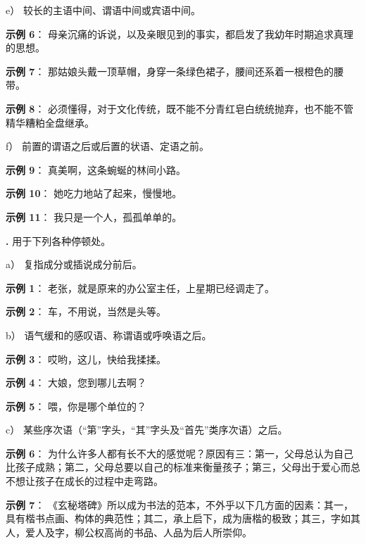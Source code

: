 \documentclass[a4paper]{article}
\newcounter{mycounter}[subsubsection]
\renewcommand{\themycounter}{\textbf{\thesubsubsection.\arabic{mycounter}}}
\begin{document}
e）
较长的主语中间、谓语中间或宾语中间。

\hspace{1em}\textbf{示例 6}：
母亲沉痛的诉说，以及亲眼见到的事实，都启发了我幼年时期追求真理的思想。

\hspace{1em}\textbf{示例 7}：
那姑娘头戴一顶草帽，身穿一条绿色裙子，腰间还系着一根橙色的腰带。

\hspace{1em}\textbf{示例 8}：
必须懂得，对于文化传统，既不能不分青红皂白统统抛弃，也不能不管精华糟粕全盘继承。

f）
前置的谓语之后或后置的状语、定语之前。

\hspace{1em}\textbf{示例 9}：
真美啊，这条蜿蜒的林间小路。

\hspace{1em}\textbf{示例 10}：
她吃力地站了起来，慢慢地。

\hspace{1em}\textbf{示例 11}：
我只是一个人，孤孤单单的。
\vspace{1em}

\themycounter\hspace{1em}
用于下列各种停顿处。

a）
复指成分或插说成分前后。

\hspace{1em}\textbf{示例 1}：
老张，就是原来的办公室主任，上星期已经调走了。

\hspace{1em}\textbf{示例 2}：
车，不用说，当然是头等。

b）
语气缓和的感叹语、称谓语或呼唤语之后。

\hspace{1em}\textbf{示例 3}：
哎哟，这儿，快给我揉揉。

\hspace{1em}\textbf{示例 4}：
大娘，您到哪儿去啊？

\hspace{1em}\textbf{示例 5}：
喂，你是哪个单位的？

c）
某些序次语（“第”字头，“其”字头及“首先”类序次语）之后。

\hspace{1em}\textbf{示例 6}：
为什么许多人都有长不大的感觉呢？原因有三：第一，父母总认为自己比孩子成熟；第二，父母总要以自己的标准来衡量孩子；第三，父母出于爱心而总不想让孩子在成长的过程中走弯路。

\hspace{1em}\textbf{示例 7}：
《玄秘塔碑》所以成为书法的范本，不外乎以下几方面的因素：其一，具有楷书点画、构体的典范性；其二，承上启下，成为唐楷的极致；其三，字如其人，爱人及字，柳公权高尚的书品、人品为后人所崇仰。
\end{document}
